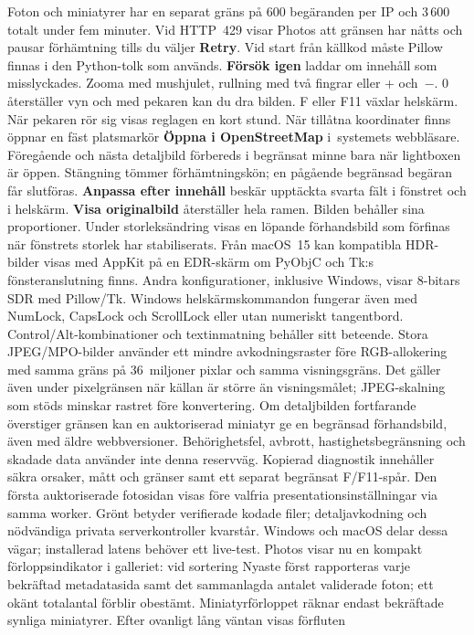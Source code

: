 \documentclass[11pt,a4paper]{article}
\newcommand{\ui}[1]{\textbf{#1}}
\begin{document}
Foton och miniatyrer har en separat gräns på 600
begäranden per IP och 3\,600 totalt under fem minuter. Vid HTTP~429 visar
Photos att gränsen har nåtts och pausar förhämtning tills du väljer
\ui{Retry}. Vid start från källkod måste Pillow finnas i den Python-tolk som används.
\ui{Försök igen} laddar om innehåll som misslyckades. Zooma med mushjulet,
rullning med två fingrar eller + och~\ensuremath{-}. 0 återställer vyn och med pekaren kan
du dra bilden. F eller F11 växlar helskärm. När pekaren rör sig visas reglagen
en kort stund.
När tillåtna koordinater finns
öppnar en fäst platsmarkör \ui{Öppna i OpenStreetMap} i~systemets webbläsare.
Föregående och nästa detaljbild förbereds i begränsat minne bara när lightboxen
är öppen. Stängning tömmer förhämtningskön; en pågående begränsad begäran får
slutföras.
\ui{Anpassa efter innehåll} beskär upptäckta svarta fält i fönstret och i
helskärm. \ui{Visa originalbild} återställer hela ramen. Bilden behåller sina
proportioner. Under storleksändring visas en löpande förhandsbild som förfinas
när fönstrets storlek har stabiliserats. Från macOS~15 kan kompatibla
HDR-bilder visas med AppKit på en EDR-skärm om PyObjC och Tk:s
fönsteranslutning finns. Andra konfigurationer, inklusive Windows, visar
8-bitars SDR med Pillow/Tk.
Windows helskärmskommandon fungerar även med NumLock, CapsLock och ScrollLock
eller utan numeriskt tangentbord. Control/Alt-kombinationer och textinmatning
behåller sitt beteende. Stora JPEG/MPO-bilder använder ett mindre avkodningsraster
före RGB-allokering med samma gräns på 36~miljoner pixlar och samma visningsgräns.
Det gäller även under pixelgränsen när källan är större än visningsmålet;
JPEG-skalning som stöds minskar rastret före konvertering.
Om detaljbilden fortfarande överstiger gränsen kan en auktoriserad miniatyr
ge en begränsad förhandsbild, även med äldre webbversioner. Behörighetsfel,
avbrott, hastighetsbegränsning och skadade data använder inte denna reservväg.
Kopierad diagnostik innehåller säkra orsaker, mått och gränser samt ett separat
begränsat F/F11-spår.
Den första auktoriserade fotosidan visas före valfria presentationsinställningar
via samma worker. Grönt betyder verifierade kodade filer; detaljavkodning och
nödvändiga privata serverkontroller kvarstår. Windows och macOS delar dessa
vägar; installerad latens behöver ett live-test.
Photos visar nu en kompakt förloppsindikator i galleriet: vid sortering
Nyaste först rapporteras varje bekräftad metadatasida samt det sammanlagda antalet
validerade foton; ett okänt totalantal förblir obestämt. Miniatyrförloppet räknar
endast bekräftade synliga miniatyrer. Efter ovanligt lång väntan visas förfluten
\end{document}
